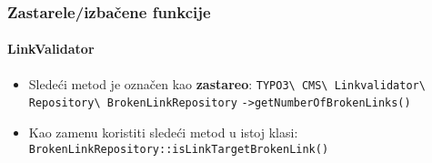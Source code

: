 %
%
%
%
%
%
%
%
%

\begin{frame}[fragile]
	\frametitle{Zastarele/izbačene funkcije}
	\framesubtitle{LinkValidator}

	\begin{itemize}
		\item Sledeći metod je označen kao \textbf{zastareo}:
		\newline\newline
			\smaller
				\texttt{TYPO3\textbackslash
					CMS\textbackslash
					Linkvalidator\textbackslash
					Repository\textbackslash
					BrokenLinkRepository}\newline
				\texttt{->getNumberOfBrokenLinks()}\normalsize\newline

		\item Kao zamenu koristiti sledeći metod u istoj klasi:\newline
			\small\texttt{BrokenLinkRepository::isLinkTargetBrokenLink()}\normalsize

	\end{itemize}

\end{frame}


